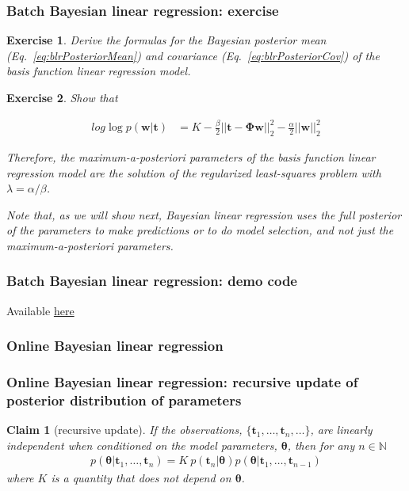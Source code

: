 \documentclass{beamer}
\newtheorem{claim}{Claim}
\newtheorem{probExercise}{Exercise}
\begin{document}
\begin{frame}
    \frametitle{Batch Bayesian linear regression: exercise}

    \scriptsize
    \begin{probExercise}
		Derive the formulas for the Bayesian posterior mean
(Eq.~\ref{eq:blrPosteriorMean}) and covariance (Eq.~\ref{eq:blrPosteriorCov})
of the basis function linear regression model.
    \end{probExercise}

    \begin{probExercise}
        Show that

        \begin{align}
            log
            \log p(\mathbf{w}|\boldsymbol{t})&=K-\frac{\beta}{2}||\mathbf{t}-\boldsymbol{\Phi}\mathbf{w}||_2^2-\frac{\alpha}{2}||\mathbf{w}||_2^2
        \end{align}

        Therefore, the maximum-a-posteriori parameters of the basis function
        linear regression model are the solution of the regularized
        least-squares problem with $\lambda=\alpha/\beta$.

        Note that, as we will show next, Bayesian linear regression uses the
        full posterior of the parameters to make predictions or to do model
        selection, and not just the maximum-a-posteriori parameters.

    \end{probExercise}
    \normalsize

\end{frame}

\begin{frame}
    \frametitle{Batch Bayesian linear regression: demo code}
    Available \href{https://joacorapela.github.io/gcnuBridging2023/auto\_examples/bayesianLinearRegression/plotBatchBayesianLinearRegression.html\#sphx-glr-auto-examples-bayesianlinearregression-plotbatchbayesianlinearregression-py}{here}
\end{frame}

\subsubsection{Online Bayesian linear regression}

\begin{frame}
    \frametitle{Online Bayesian linear regression: recursive update of posterior distribution of parameters}
	\scriptsize
	\begin{claim}[recursive update]
		If the observations, $\{\mathbf{t}_1,\ldots,\mathbf{t}_n,\dots\}$, are linearly independent when conditioned on the model parameters, $\boldsymbol{\theta}$, then for any $n\in\mathbb{N}$
		\begin{align}
			p(\boldsymbol{\theta}|\mathbf{t}_1,\ldots,\mathbf{t}_n)=K\ p(\mathbf{t}_n|\boldsymbol{\theta})p(\boldsymbol{\theta}|\mathbf{t}_1,\ldots,\mathbf{t}_{n-1})
		\end{align}
		where $K$ is a quantity that does not depend on $\boldsymbol{\theta}$.
	\end{claim}
	\normalsize
\end{frame}
\end{document}
